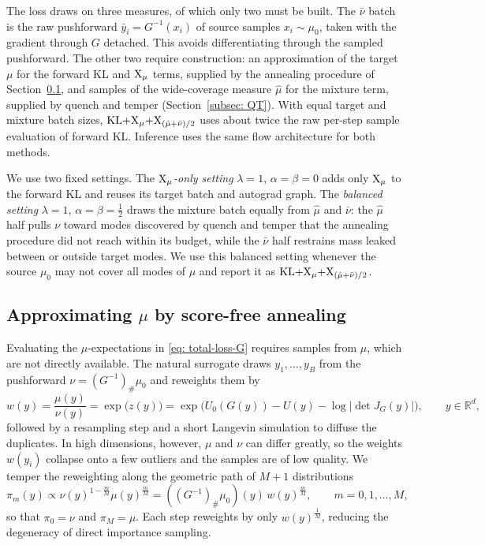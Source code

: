 \documentclass{article}
\begin{document}
The loss draws on three measures, of which only two must be built. The $\bar\nu$ batch is the raw pushforward $\bar y_i = G^{-1}(x_i)$ of source samples $x_i \sim \mu_0$, taken with the gradient through $G$ detached. This avoids differentiating through the sampled pushforward. The other two require construction: an approximation of the target $\mu$ for the forward KL and $\mathrm{X}_\mu$ terms, supplied by the annealing procedure of Section~\ref{subsec: ais}, and samples of the wide-coverage measure $\hat\mu$ for the mixture term, supplied by quench and temper (Section~\ref{subsec: QT}). With equal target and mixture batch sizes, $\mathrm{KL}{+}\mathrm{X}_\mu{+}\mathrm{X}_{(\hat\mu+\bar\nu)/2}$ uses about twice the raw per-step sample evaluation of forward KL. Inference uses the same flow architecture for both methods.

We use two fixed settings. The \emph{$\mathrm{X}_\mu$-only setting} $\lambda = 1$, $\alpha = \beta = 0$ adds only $\mathrm{X}_\mu$ to the forward KL and reuses its target batch and autograd graph. The \emph{balanced setting} $\lambda = 1$, $\alpha = \beta = \frac12$ draws the mixture batch equally from $\hat\mu$ and $\bar\nu$: the $\hat\mu$ half pulls $\nu$ toward modes discovered by quench and temper that the annealing procedure did not reach within its budget, while the $\bar\nu$ half restrains mass leaked between or outside target modes. We use this balanced setting whenever the source $\mu_0$ may not cover all modes of $\mu$ and report it as $\mathrm{KL}{+}\mathrm{X}_\mu{+}\mathrm{X}_{(\hat\mu+\bar\nu)/2}$.

\subsection{Approximating $\mu$ by score-free annealing}
\label{subsec: ais}

Evaluating the $\mu$-expectations in \eqref{eq: total-loss-G} requires samples from $\mu$, which are not directly available. The natural surrogate draws $y_1,\dots,y_B$ from the pushforward $\nu = (G^{-1})_{\#} \mu_0$ and reweights them by
\begin{equation}
    w(y) = \frac{\mu(y)}{\nu(y)} = \exp\bigl(z(y)\bigr) = \exp\Big( U_0(G(y)) - U(y) - \log|\det J_G(y)| \Big), \qquad y \in \mathbb R^d,
    \label{eq: weight}
\end{equation}
followed by a resampling step and a short Langevin simulation to diffuse the duplicates. In high dimensions, however, $\mu$ and $\nu$ can differ greatly, so the weights $w(y_i)$ collapse onto a few outliers and the samples are of low quality. We temper the reweighting along the geometric path of $M+1$ distributions
\begin{equation}
    \pi_m(y) \propto \nu(y)^{1-\frac{m}{M}} \mu(y)^{\frac{m}{M}} = ((G^{-1})_{\#}\mu_0)(y)\, w(y)^{\frac{m}{M}}, \qquad m = 0,1,\dots,M,
    \label{eq: pi-m}
\end{equation}
so that $\pi_0 = \nu$ and $\pi_M = \mu$. Each step reweights by only $w(y)^{\frac{1}{M}}$, reducing the degeneracy of direct importance sampling.
\end{document}
